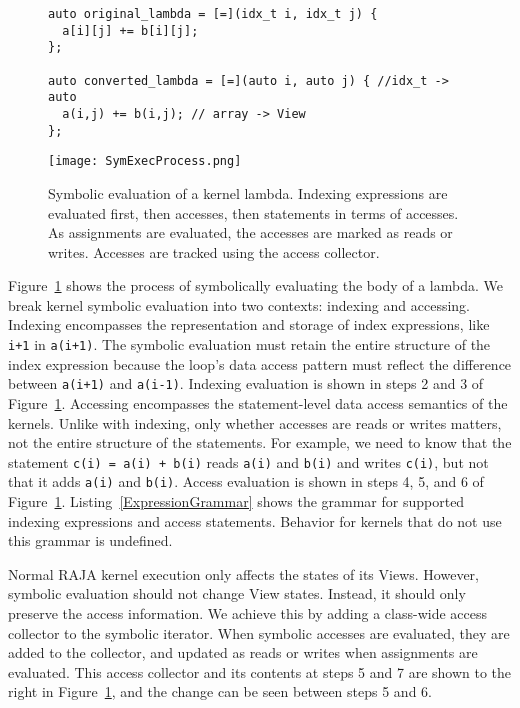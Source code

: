 \begin{figure}[t]
\begin{lstlisting}[label={symExecChanges}, caption={Kernel Lambda Conversion}]
auto original_lambda = [=](idx_t i, idx_t j) {
  a[i][j] += b[i][j];
};

auto converted_lambda = [=](auto i, auto j) { //idx_t -> auto
  a(i,j) += b(i,j); // array -> View
};
\end{lstlisting}
\end{figure}

\begin{figure}
\texttt{[image: SymExecProcess.png]}
\caption{Symbolic evaluation of a kernel lambda. 
Indexing expressions are evaluated first, then accesses, then statements in terms of accesses.
As assignments are evaluated, the accesses are marked as reads or writes.
Accesses are tracked using the access collector.}
\label{symExec}
\end{figure}

Figure~\ref{symExec} shows the process of symbolically evaluating the body of a lambda. 
We break kernel symbolic evaluation into two contexts: indexing and accessing. 
Indexing encompasses the representation and storage of index expressions, like
\verb.i+1. in \verb.a(i+1)..
The symbolic evaluation must retain the entire structure of the index expression 
because the loop's
data access pattern must reflect the difference between \verb.a(i+1). and
\verb.a(i-1)..
Indexing evaluation is shown in steps 2 and 3 of Figure~\ref{symExec}.
Accessing encompasses the statement-level data access semantics of the kernels.
Unlike with indexing, only whether accesses are reads or writes matters,
not the entire structure of the statements.
For example, we need to know that the statement \verb.c(i) = a(i) + b(i).
reads \verb.a(i). and \verb.b(i). and writes \verb.c(i)., but not that it
adds \verb.a(i). and \verb.b(i)..
Access evaluation is shown in steps 4, 5, and 6 of Figure~\ref{symExec}.
Listing~\ref{ExpressionGrammar} shows the grammar for supported indexing expressions and access statements. 
Behavior for kernels that do not use this grammar is undefined.

Normal RAJA kernel execution only affects the states of its Views. 
However, symbolic evaluation should not change View states. 
Instead, it should only preserve the access information.
We achieve this by adding a class-wide access collector to the symbolic iterator. 
When symbolic accesses are evaluated, they are added to the collector, and updated as reads or writes when assignments are evaluated.
This access collector and its contents at steps 5 and 7 are shown to the right in Figure~\ref{symExec}, and the change can be seen between steps 5 and 6.
 


